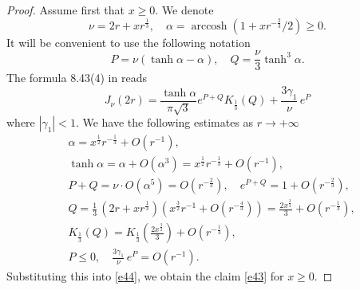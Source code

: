 \documentclass[12pt]{amsart}
\newcommand{\g}{\gamma}
\theoremstyle{plain}
\theoremstyle{definition}
\numberwithin{equation}{section}
\begin{document}
\begin{proof}
Assume first that $x\ge 0$. We denote 
%
\begin{equation*}
\nu=2r+xr^{\frac 13},\quad \alpha=\operatorname{arccosh}\left(1+xr^{-\frac 
23}/2\right)\ge 0.
\end{equation*}
%
It will be convenient to use the following notation
%
\begin{equation*}
P=\nu(\tanh\alpha-\alpha),\quad
Q=\frac \nu3 \tanh^3\alpha.
\end{equation*}
%
The formula 8.43(4) in \cite{W} reads
%
\begin{equation}\label{e44} 
J_{\nu}(2r)=\frac {\tanh\alpha}{\pi\sqrt{3}}e^{P+Q}K_{\frac 
13}\left(Q\right)+\frac{3\g_1}{\nu}\,e^{P}
\end{equation}
%
where $|\g_1|<1$. We have the following estimates as $r\to+\infty$
%
\begin{align*}
&\alpha=x^{\frac 12}r^{-\frac 13}+O(r^{-1}),\\
&\tanh\alpha=\alpha+O(\alpha^3)=x^{\frac 12}r^{-\frac 13}+O(r^{-1}),\\
&P+Q=\nu\cdot O(\alpha^5)=O(r^{-\frac 23}),\quad
e^{P+Q}=1+O(r^{-\frac 23}),\\
&Q=\frac 13\,\left(2r+xr^{\frac 13}\right)\left(x^{\frac 32}r^{- 1}+O(r^{-\frac 
43})\right)=\frac{2x^{\frac 32}}3+O(r^{-\frac 13}),\\
&K_{\frac 13}\left(Q\right)=K_{\frac 13}\left(\frac {2x^{\frac 
32}}{3}\right)+O(r^{-\frac 13}),\\
&P\le 0,\quad\frac{3\g_1}{\nu}\,e^{P}=O(r^{-1}).
\end{align*}
%
Substituting this into \eqref{e44}, we obtain the claim \eqref{e43}  for $x\ge 0$.



\end{proof}
\end{document}
